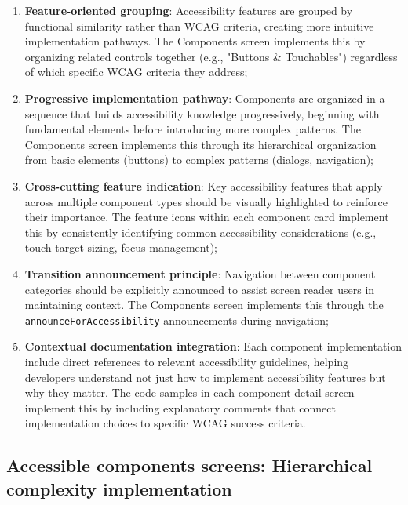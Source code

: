 \begin{enumerate}
    \item \textbf{Feature-oriented grouping}: Accessibility features are grouped by functional similarity rather than WCAG criteria, creating more intuitive implementation pathways. The Components screen implements this by organizing related controls together (e.g., "Buttons \& Touchables") regardless of which specific WCAG criteria they address;
    
    \item \textbf{Progressive implementation pathway}: Components are organized in a sequence that builds accessibility knowledge progressively, beginning with fundamental elements before introducing more complex patterns. The Components screen implements this through its hierarchical organization from basic elements (buttons) to complex patterns (dialogs, navigation);
    
    \item \textbf{Cross-cutting feature indication}: Key accessibility features that apply across multiple component types should be visually highlighted to reinforce their importance. The feature icons within each component card implement this by consistently identifying common accessibility considerations (e.g., touch target sizing, focus management);
    
    \item \textbf{Transition announcement principle}: Navigation between component categories should be explicitly announced to assist screen reader users in maintaining context. The Components screen implements this through the \texttt{announceForAccessibility} announcements during navigation;
    
    \item \textbf{Contextual documentation integration}: Each component implementation include direct references to relevant accessibility guidelines, helping developers understand not just how to implement accessibility features but why they matter. The code samples in each component detail screen implement this by including explanatory comments that connect implementation choices to specific WCAG success criteria.
\end{enumerate}

\subsection{Accessible components screens: Hierarchical complexity implementation}
\label{subsec:accessible-components-beyond-wcag}

